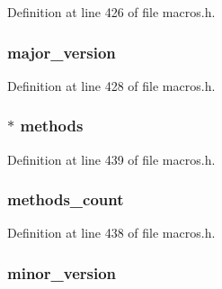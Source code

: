 Definition at line 426 of file macros.\+h.

\hypertarget{struct_class_file_a5a3ef20c14bd517fca3fa5841846ab4b}{}
\subsubsection[{major\+\_\+version}]{ major\+\_\+version}\label{struct_class_file_a5a3ef20c14bd517fca3fa5841846ab4b}


Definition at line 428 of file macros.\+h.

\hypertarget{struct_class_file_af0fc99630af87d96f99637f77f6bb565}{}
\subsubsection[{methods}]{$\ast$ methods}\label{struct_class_file_af0fc99630af87d96f99637f77f6bb565}


Definition at line 439 of file macros.\+h.

\hypertarget{struct_class_file_a8858a4e08f7cc000e0f62459722ecce8}{}
\subsubsection[{methods\+\_\+count}]{ methods\+\_\+count}\label{struct_class_file_a8858a4e08f7cc000e0f62459722ecce8}


Definition at line 438 of file macros.\+h.

\hypertarget{struct_class_file_ad0028839ce12090266cbdc5df1046062}{}
\subsubsection[{minor\+\_\+version}]{ minor\+\_\+version}\label{struct_class_file_ad0028839ce12090266cbdc5df1046062}


